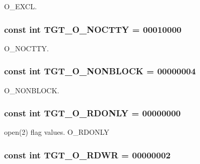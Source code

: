 O\_\-EXCL. \hypertarget{classAlphaLinux_adfd4240281579e5f60c5e22c601225d8}{
\subsubsection[{TGT\_\-O\_\-NOCTTY}]{\setlength{\rightskip}{0pt plus 5cm}const int {\bf TGT\_\-O\_\-NOCTTY} = 00010000}}
\label{classAlphaLinux_adfd4240281579e5f60c5e22c601225d8}


O\_\-NOCTTY. \hypertarget{classAlphaLinux_a0ea5420b4c9b45ba342a266fb77ac942}{
\subsubsection[{TGT\_\-O\_\-NONBLOCK}]{\setlength{\rightskip}{0pt plus 5cm}const int {\bf TGT\_\-O\_\-NONBLOCK} = 00000004}}
\label{classAlphaLinux_a0ea5420b4c9b45ba342a266fb77ac942}


O\_\-NONBLOCK. \hypertarget{classAlphaLinux_ad266b23a0ae07d1833e18bae651f3411}{
\subsubsection[{TGT\_\-O\_\-RDONLY}]{\setlength{\rightskip}{0pt plus 5cm}const int {\bf TGT\_\-O\_\-RDONLY} = 00000000}}
\label{classAlphaLinux_ad266b23a0ae07d1833e18bae651f3411}


open(2) flag values. O\_\-RDONLY \hypertarget{classAlphaLinux_ac6fa9ecf5d2f3314f197698f1099e2ac}{
\subsubsection[{TGT\_\-O\_\-RDWR}]{\setlength{\rightskip}{0pt plus 5cm}const int {\bf TGT\_\-O\_\-RDWR} = 00000002}}
\label{classAlphaLinux_ac6fa9ecf5d2f3314f197698f1099e2ac}


